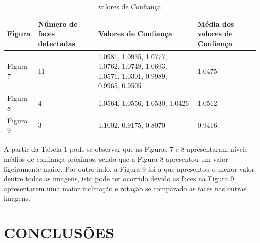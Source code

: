 \documentclass[conference]{IEEEtran}
\begin{document}
		\begin{table}[h!b]
		\caption{valores de Confiança}
		\label{table}
		\setlength{\tabcolsep}{4pt}
		\begin{tabular}{|p{30pt}|p{50pt}|p{90pt}|p{50pt}|}
			\hline
				Figura & Número de faces detectadas & Valores de Confiança & Média dos valores de Confiança\\
			\hline
				Figura 7 & 11 & 1.0981, 1.0935, 1.0777, 1.0762, 1.0748, 1.0693, 1.0571, 1.0301, 0.9989, 0.9965, 0.9505 				& 1.0475 \\
			\hline
				Figura 8 & 4 & 1.0564, 1.0556, 1.0530, 1.0426 & 1.0512\\ 
			\hline
				Figura 9 & 3 & 1.1002, 0.9175, 0.8070 & 0.9416\\ 
			\hline
		\end{tabular}
		\label{tab1}
		\end{table}        
          
          A partir da Tabela 1 pode-se observar que as Figuras 7 e 8 apresentaram níveis médios de confiança próximos, sendo que a Figura 8 apresentou um valor ligeiramente maior. Por outro lado, a Figura 9 foi a que apresentou o menor valor dentre todas as imagens, isto pode ter ocorrido devido as faces na Figura 9 apresentarem uma maior inclinação e rotação se comparado as faces nas outras imagens.
	
	\section{CONCLUSÕES}
         
      
         
\end{document}

